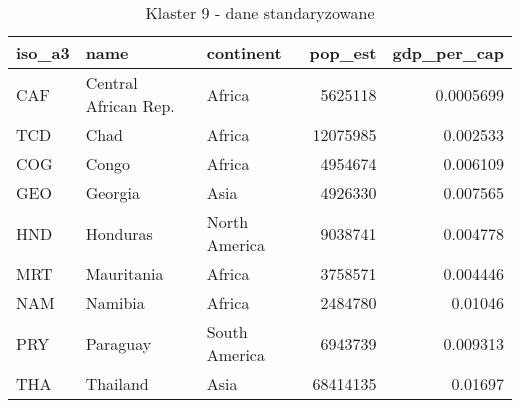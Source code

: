 \begin{table}[h!]
    \centering
    \caption{Klaster 9 - dane standaryzowane}
    \label{tab:cl9std}
    \begin{tabular}{lllrr}
        \toprule
        iso\_a3 & name                 & continent     & pop\_est & gdp\_per\_cap \\
        \midrule
        CAF     & Central African Rep. & Africa        & 5625118  & 0.0005699     \\
        TCD     & Chad                 & Africa        & 12075985 & 0.002533      \\
        COG     & Congo                & Africa        & 4954674  & 0.006109      \\
        GEO     & Georgia              & Asia          & 4926330  & 0.007565      \\
        HND     & Honduras             & North America & 9038741  & 0.004778      \\
        MRT     & Mauritania           & Africa        & 3758571  & 0.004446      \\
        NAM     & Namibia              & Africa        & 2484780  & 0.01046       \\
        PRY     & Paraguay             & South America & 6943739  & 0.009313      \\
        THA     & Thailand             & Asia          & 68414135 & 0.01697       \\
        \bottomrule
    \end{tabular}
\end{table}

